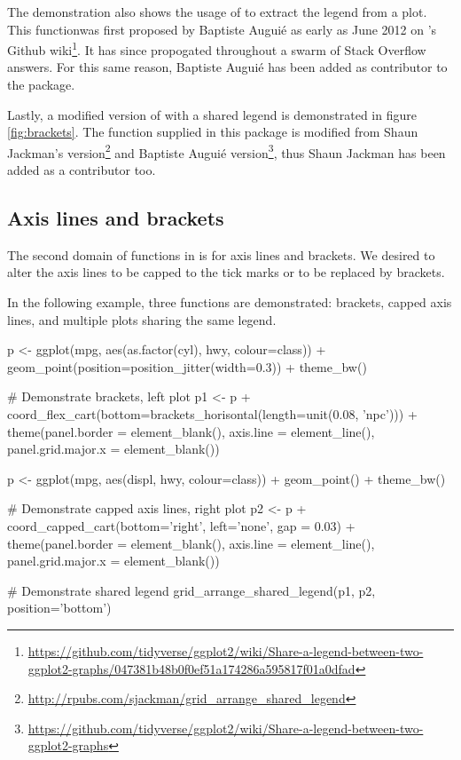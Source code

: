 The demonstration also shows the usage of  to extract
the legend from a plot. This functionwas first proposed by Baptiste
Augui\'{e} as early as June 2012 on 's Github
wiki\footnote{\url{https://github.com/tidyverse/ggplot2/wiki/Share-a-legend-between-two-ggplot2-graphs/047381b48b0f0ef51a174286a595817f01a0dfad}}.
It has since propogated throughout a swarm of Stack Overflow answers.
For this same reason, Baptiste Augui\'{e} has been added as contributor
to the  package.

Lastly, a modified version of  with a shared legend
is demonstrated in figure \ref{fig:brackets}. The function
 supplied in this package is
modified from Shaun Jackman's
version\footnote{\url{http://rpubs.com/sjackman/grid\_arrange\_shared\_legend}}
and Baptiste Augui\'{e}
version\footnote{\url{https://github.com/tidyverse/ggplot2/wiki/Share-a-legend-between-two-ggplot2-graphs}},
thus Shaun Jackman has been added as a contributor too.

\subsection{Axis lines and brackets}

The second domain of functions in  is for axis lines and
brackets. We desired to alter the axis lines to be capped to the tick
marks or to be replaced by brackets.

In the following example, three functions are demonstrated: brackets,
capped axis lines, and multiple plots sharing the same legend.


\begin{Sinput}
p <- ggplot(mpg, aes(as.factor(cyl), hwy, colour=class)) +
  geom_point(position=position_jitter(width=0.3)) +
  theme_bw()

# Demonstrate brackets, left plot
p1 <- p + coord_flex_cart(bottom=brackets_horisontal(length=unit(0.08, 'npc'))) +
  theme(panel.border = element_blank(), axis.line = element_line(),
        panel.grid.major.x = element_blank())

p <- ggplot(mpg, aes(displ, hwy, colour=class)) + geom_point() +
  theme_bw()

# Demonstrate capped axis lines, right plot
p2 <- p + coord_capped_cart(bottom='right', left='none', gap = 0.03) +
  theme(panel.border = element_blank(), axis.line = element_line(),
        panel.grid.major.x = element_blank())

# Demonstrate shared legend
grid_arrange_shared_legend(p1, p2, position='bottom')
\end{Sinput}


